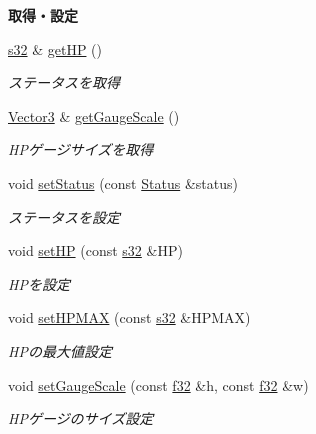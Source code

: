 \begin{Indent}{\bf 取得・設定}\par
\begin{DoxyCompactItemize}
\item 
\hyperlink{_main_8h_a0ce6887c26c1c49ad3be5710dd42bfd6}{s32} \& \hyperlink{struct_status_ab11ff5709bfc35f8645fdfd1d3a8d307}{get\-H\-P} ()
\begin{DoxyCompactList}\small\item\em ステータスを取得 \end{DoxyCompactList}\item 
\hyperlink{struct_vector3}{Vector3} \& \hyperlink{struct_status_a71b9de7caa6125e8dae19a0eea3a8973}{get\-Gauge\-Scale} ()
\begin{DoxyCompactList}\small\item\em H\-Pゲージサイズを取得 \end{DoxyCompactList}\item 
void \hyperlink{struct_status_ab2e23c57bb1aac0fd4eb7332ce63d995}{set\-Status} (const \hyperlink{struct_status}{Status} \&status)
\begin{DoxyCompactList}\small\item\em ステータスを設定 \end{DoxyCompactList}\item 
void \hyperlink{struct_status_a5cc59af1c22240f8e782fb14c82b0058}{set\-H\-P} (const \hyperlink{_main_8h_a0ce6887c26c1c49ad3be5710dd42bfd6}{s32} \&H\-P)
\begin{DoxyCompactList}\small\item\em H\-Pを設定 \end{DoxyCompactList}\item 
void \hyperlink{struct_status_ac30ebcb1541ccb9e3aa539133dacbfa0}{set\-H\-P\-M\-A\-X} (const \hyperlink{_main_8h_a0ce6887c26c1c49ad3be5710dd42bfd6}{s32} \&H\-P\-M\-A\-X)
\begin{DoxyCompactList}\small\item\em H\-Pの最大値設定 \end{DoxyCompactList}\item 
void \hyperlink{struct_status_a59953d659dd1077191a3265b9002be62}{set\-Gauge\-Scale} (const \hyperlink{_main_8h_a5f6906312a689f27d70e9d086649d3fd}{f32} \&h, const \hyperlink{_main_8h_a5f6906312a689f27d70e9d086649d3fd}{f32} \&w)
\begin{DoxyCompactList}\small\item\em H\-Pゲージのサイズ設定 \end{DoxyCompactList}\end{DoxyCompactItemize}
\end{Indent}

